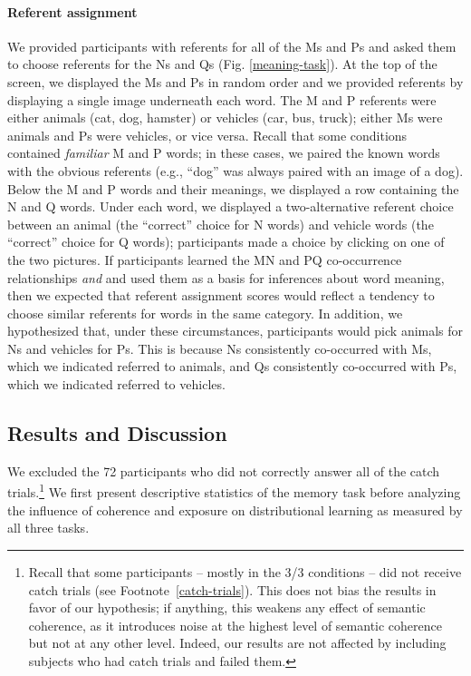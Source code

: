 \documentclass[man,longtable,floatsintext]{my-apa6}
\begin{document}
\paragraph{Referent assignment}

We provided participants with referents for all of the Ms and Ps and asked them to choose referents for the Ns and Qs (Fig. \ref{meaning-task}). At the top of the screen, we displayed the Ms and Ps in random order and we provided referents by displaying a single image underneath each word. The M and P referents were either animals (cat, dog, hamster) or vehicles (car, bus, truck); either Ms were animals and Ps were vehicles, or vice versa. Recall that some conditions contained \emph{familiar} M and P words; in these cases, we paired the known words with the obvious referents (e.g., ``dog'' was always paired with an image of a dog). Below the M and P words and their meanings, we displayed a row containing the N and Q words. Under each word, we displayed a two-alternative referent choice between an animal (the ``correct'' choice for N words) and vehicle words (the ``correct'' choice for Q words); participants made a choice by clicking on one of the two pictures. If participants learned the MN and PQ co-occurrence relationships \emph{and} and used them as a basis for inferences about word meaning, then we expected that referent assignment scores would reflect a tendency to choose similar referents for words in the same category. In addition, we hypothesized that, under these circumstances, participants would pick animals for Ns  and vehicles for Ps. This is because Ns consistently co-occurred with Ms, which we indicated referred to animals, and Qs consistently co-occurred with Ps, which we indicated referred to vehicles.

\subsection{Results and Discussion}
We excluded the 72 participants who did not correctly answer all of the catch trials.\footnote{ Recall that some participants -- mostly in the 3/3 conditions --  did not receive catch trials (see Footnote~\ref{catch-trials}). This does not bias the results in favor of our hypothesis; if anything, this weakens any effect of semantic coherence, as it introduces noise at the highest level of semantic coherence but not at any other level. Indeed, our results are not affected by including subjects who had catch trials and failed them.} We first present descriptive statistics of the memory task before analyzing the influence of coherence and exposure on distributional learning as measured by all three tasks.
\end{document}
